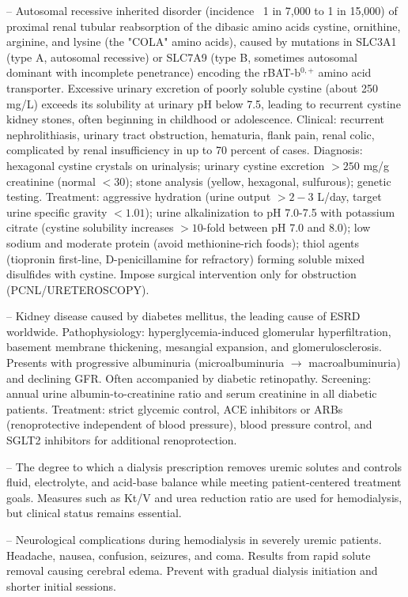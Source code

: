 -- Autosomal recessive inherited disorder (incidence ~1 in 7,000 to 1 in 15,000) of proximal renal tubular reabsorption of the dibasic amino acids cystine, ornithine, arginine, and lysine (the "COLA" amino acids), caused by mutations in SLC3A1 (type A, autosomal recessive) or SLC7A9 (type B, sometimes autosomal dominant with incomplete penetrance) encoding the rBAT-b$^{0,+}$ amino acid transporter. Excessive urinary excretion of poorly soluble cystine (about 250 mg/L) exceeds its solubility at urinary pH below 7.5, leading to recurrent cystine kidney stones, often beginning in childhood or adolescence. Clinical: recurrent nephrolithiasis, urinary tract obstruction, hematuria, flank pain, renal colic, complicated by renal insufficiency in up to 70 percent of cases. Diagnosis: hexagonal cystine crystals on urinalysis; urinary cystine excretion $> 250$ mg/g creatinine (normal $< 30$); stone analysis (yellow, hexagonal, sulfurous); genetic testing. Treatment: aggressive hydration (urine output $> 2-3$ L/day, target urine specific gravity $< 1.01$); urine alkalinization to pH 7.0-7.5 with potassium citrate (cystine solubility increases $> 10$-fold between pH 7.0 and 8.0); low sodium and moderate protein (avoid methionine-rich foods); thiol agents (tiopronin first-line, D-penicillamine for refractory) forming soluble mixed disulfides with cystine. Impose surgical intervention only for obstruction (PCNL/URETEROSCOPY).

-- Kidney disease caused by diabetes mellitus, the leading cause of ESRD worldwide. Pathophysiology: hyperglycemia-induced glomerular hyperfiltration, basement membrane thickening, mesangial expansion, and glomerulosclerosis. Presents with progressive albuminuria (microalbuminuria $\rightarrow$ macroalbuminuria) and declining GFR. Often accompanied by diabetic retinopathy. Screening: annual urine albumin-to-creatinine ratio and serum creatinine in all diabetic patients. Treatment: strict glycemic control, ACE inhibitors or ARBs (renoprotective independent of blood pressure), blood pressure control, and SGLT2 inhibitors for additional renoprotection.

-- The degree to which a dialysis prescription removes uremic solutes and controls fluid, electrolyte, and acid-base balance while meeting patient-centered treatment goals. Measures such as Kt/V and urea reduction ratio are used for hemodialysis, but clinical status remains essential.

-- Neurological complications during hemodialysis in severely uremic patients. Headache, nausea, confusion, seizures, and coma. Results from rapid solute removal causing cerebral edema. Prevent with gradual dialysis initiation and shorter initial sessions.

